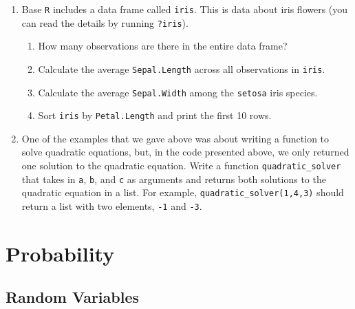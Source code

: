 \documentclass[
  letterpaper,
  DIV=11,
  numbers=noendperiod]{scrreprt}
\begin{document}
\begin{enumerate}
  \begin{enumerate}
  \def\labelenumii{\alph{enumii})}
  \item
    Write a function \texttt{is\_prime} that takes \texttt{x} as an
    argument and returns \texttt{TRUE} if \texttt{x} is a prime number
    and returns \texttt{FALSE} if \texttt{x} is not a prime number.
  \item
    Write a function \texttt{prime} that takes \texttt{n} as an argument
    and returns a vector of all the prime numbers from \(1\) to \(n\).
    If it is helpful, \texttt{prime} can call the function
    \texttt{is\_prime} that you wrote for part (a).
  \end{enumerate}
\item
  Base \texttt{R} includes a data frame called \texttt{iris}. This is
  data about iris flowers (you can read the details by running
  \texttt{?iris}).

  \begin{enumerate}
  \def\labelenumii{\alph{enumii})}
  \item
    How many observations are there in the entire data frame?
  \item
    Calculate the average \texttt{Sepal.Length} across all observations
    in \texttt{iris}.
  \item
    Calculate the average \texttt{Sepal.Width} among the \texttt{setosa}
    iris species.
  \item
    Sort \texttt{iris} by \texttt{Petal.Length} and print the first 10
    rows.
  \end{enumerate}
\item
  One of the examples that we gave above was about writing a function to
  solve quadratic equations, but, in the code presented above, we only
  returned one solution to the quadratic equation. Write a function
  \texttt{quadratic\_solver} that takes in \texttt{a}, \texttt{b}, and
  \texttt{c} as arguments and returns both solutions to the quadratic
  equation in a list. For example, \texttt{quadratic\_solver(1,4,3)}
  should return a list with two elements, \texttt{-1} and \texttt{-3}.
\end{enumerate}

\part{Probability}


\chapter{Random Variables}\label{random-variables}
\end{document}
